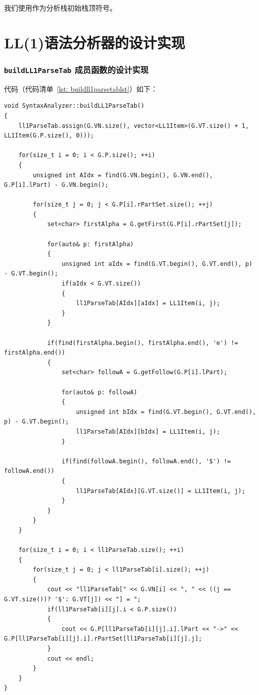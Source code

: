 \documentclass{article}
\begin{document}
\begin{CJK*}{UTF8}{gbsn}
我们使用\text{\$}作为分析栈初始栈顶符号。
	
\section{LL(1)语法分析器的设计实现}
\subsubsection{\texttt{buildLL1ParseTab} 成员函数的设计实现}
代码（代码清单~\ref{lst: buildll1parsetablst}）如下：
\begin{center}
\begin{lstlisting}[caption = {\texttt{buildLL1ParseTab} 成员函数代码清单}, label = {lst: buildll1parsetablst}]
void SyntaxAnalyzer::buildLL1ParseTab()
{
	ll1ParseTab.assign(G.VN.size(), vector<LL1Item>(G.VT.size() + 1, LL1Item(G.P.size(), 0)));

	for(size_t i = 0; i < G.P.size(); ++i)
	{
		unsigned int AIdx = find(G.VN.begin(), G.VN.end(), G.P[i].lPart) - G.VN.begin();

		for(size_t j = 0; j < G.P[i].rPartSet.size(); ++j)
		{
			set<char> firstAlpha = G.getFirst(G.P[i].rPartSet[j]);

			for(auto& p: firstAlpha)
			{
				unsigned int aIdx = find(G.VT.begin(), G.VT.end(), p) - G.VT.begin();
				if(aIdx < G.VT.size())
				{
					ll1ParseTab[AIdx][aIdx] = LL1Item(i, j);					
				}
			}

			if(find(firstAlpha.begin(), firstAlpha.end(), 'e') != firstAlpha.end())
			{
				set<char> followA = G.getFollow(G.P[i].lPart);
				
				for(auto& p: followA)
				{
					unsigned int bIdx = find(G.VT.begin(), G.VT.end(), p) - G.VT.begin();
					ll1ParseTab[AIdx][bIdx] = LL1Item(i, j);
				}

				if(find(followA.begin(), followA.end(), '$') != followA.end())
				{
					ll1ParseTab[AIdx][G.VT.size()] = LL1Item(i, j);
				}
			}
		}
	}

	for(size_t i = 0; i < ll1ParseTab.size(); ++i)
	{
		for(size_t j = 0; j < ll1ParseTab[i].size(); ++j)
		{
			cout << "ll1ParseTab[" << G.VN[i] << ", " << ((j == G.VT.size())? '$': G.VT[j]) << "] = ";
			if(ll1ParseTab[i][j].i < G.P.size())
			{
				cout << G.P[ll1ParseTab[i][j].i].lPart << "->" << G.P[ll1ParseTab[i][j].i].rPartSet[ll1ParseTab[i][j].j];
			}
			cout << endl;
		}
	}
}
\end{lstlisting}
\end{center}


\end{CJK*}
\end{document}
